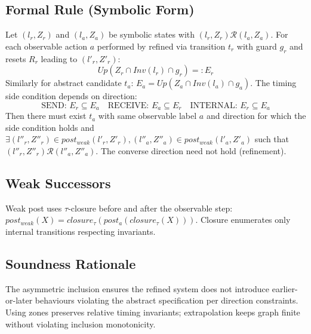 \subsection{Formal Rule (Symbolic Form)}
Let \((l_r, Z_r)\) and \((l_a, Z_a)\) be symbolic states with \((l_r, Z_r) \mathcal{R} (l_a, Z_a)\). For each observable action \(a\) performed by refined via transition \(t_r\) with guard \(g_r\) and resets \(R_r\) leading to \((l'_r, Z'_r)\):
\[
  Up(Z_r \cap Inv(l_r) \cap g_r) =: E_r
\]
Similarly for abstract candidate \(t_a\): \(E_a = Up(Z_a \cap Inv(l_a) \cap g_a)\). The timing side condition depends on direction:
\[
  \text{SEND: } E_r \subseteq E_a \quad \text{RECEIVE: } E_a \subseteq E_r \quad \text{INTERNAL: } E_r \subseteq E_a
\]
Then there must exist $t_a$ with same observable label $a$ and direction for which the side condition holds and \(\exists (l''_r, Z''_r) \in post_{weak}(l'_r, Z'_r), (l''_a, Z''_a) \in post_{weak}(l'_a, Z'_a)\) such that \((l''_r, Z''_r) \mathcal{R} (l''_a, Z''_a)\). The converse direction need not hold (refinement).

\subsection{Weak Successors}
Weak post uses $\tau$-closure before and after the observable step: \(post_{weak}(X) = closure_\tau(post_a(closure_\tau(X)))\). Closure enumerates only internal transitions respecting invariants.

\subsection{Soundness Rationale}
The asymmetric inclusion ensures the refined system does not introduce earlier-or-later behaviours violating the abstract specification per direction constraints. Using zones preserves relative timing invariants; extrapolation keeps graph finite without violating inclusion monotonicity.
